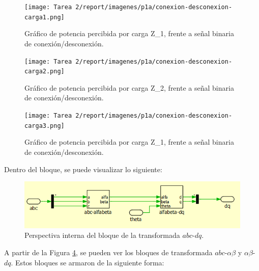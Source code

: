 \begin{figure}
    \centering
    \texttt{[image: Tarea 2/report/imagenes/p1a/conexion-desconexion-carga1.png]}
    \caption{Gráfico de potencia percibida por carga Z_1, frente a señal binaria de conexión/desconexión.}
    \label{conexion-desconexion-carga1}
\end{figure}

\begin{figure}
    \centering
    \texttt{[image: Tarea 2/report/imagenes/p1a/conexion-desconexion-carga2.png]}
    \caption{Gráfico de potencia percibida por carga Z_2, frente a señal binaria de conexión/desconexión.}
    \label{conexion-desconexion-carga2}
\end{figure}

\begin{figure}
    \centering
    \texttt{[image: Tarea 2/report/imagenes/p1a/conexion-desconexion-carga3.png]}
    \caption{Gráfico de potencia percibida por carga Z_1, frente a señal binaria de conexión/desconexión.}
    \label{conexion-desconexion-carga1}
\end{figure}

Dentro del bloque, se puede visualizar lo siguiente:

\begin{figure}
    \centering
    \includegraphics[width=0.5\linewidth]{Tarea 1/report/imagenes/p1a/transformadapordentro.png}
    \caption{Perspectiva interna del bloque de la transformada $abc$-$dq$.}
    \label{transformadapordentro}
\end{figure}

A partir de la Figura \ref{transformadapordentro}, se pueden ver los bloques de transformada $abc$-$\alpha\beta$ y $\alpha\beta$-$dq$. Estos bloques se armaron de la siguiente forma:

